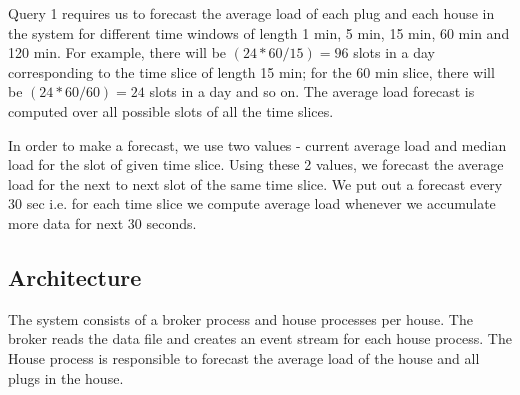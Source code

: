 Query 1 requires us to forecast the average load of each plug and each house in the system for different time windows of length 1 min, 5 min, 15 min, 60 min and 120 min.
For example, there will be $(24*60/15) = 96$ slots in a day corresponding to the time slice of length 15 min; for the 60 min slice, there will be $(24*60/60) = 24$ slots in a day and so on.
The average load forecast is computed over all possible slots of all the time slices.

In order to make a forecast, we use two values - current average load and median load for the slot of given time slice.
Using these 2 values, we forecast the average load for the next to next slot of the same time slice.
We put out a forecast every 30 sec i.e.
for each time slice we compute average load whenever we accumulate more data for next 30 seconds.

\subsection{Architecture}
The system consists of a broker process and house processes per house.
The broker reads the data file and creates an event stream for each house process. %
The House process is responsible to forecast the average load of the house and all plugs in the house.

